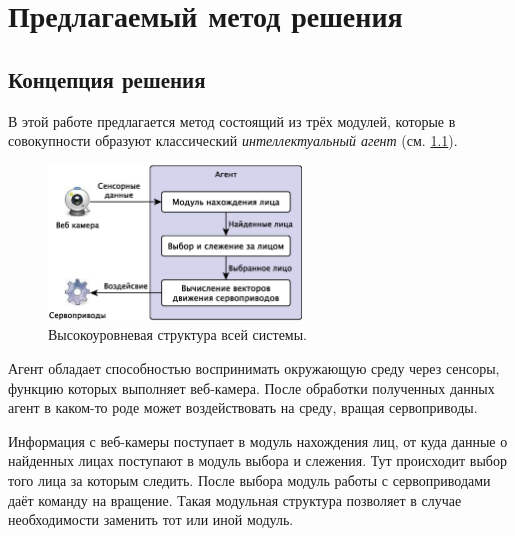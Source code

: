 \documentclass[12pt]{report}
\begin{document}
\chapter{Предлагаемый метод решения}
\thispagestyle{fancy}
\section{Концепция решения}
В этой работе предлагается метод состоящий из трёх модулей, которые в совокупности образуют классический \emph
{интеллектуальный агент} (см. \ref{fig:agent}). 

\begin{figure}[h]
	\centering
	\includegraphics[width=0.6\textwidth]{Pictures/Agent.eps}
	\caption{Высокоуровневая структура всей системы.}
	\label{fig:agent}
\end{figure}

Агент обладает способностью воспринимать окружающую среду через сенсоры, функцию которых выполняет веб-камера. 
После 
обработки полученных данных агент в каком-то роде может воздействовать на среду, вращая сервоприводы. \citep
{рассел2006искусственный}

Информация с веб-камеры поступает в модуль нахождения лиц, от куда данные о найденных лицах поступают в модуль 
выбора 
и слежения. Тут происходит выбор того лица за которым следить. После выбора модуль работы с сервоприводами даёт 
команду на вращение. Такая модульная структура позволяет в случае необходимости заменить тот или иной модуль. 
\end{document}

